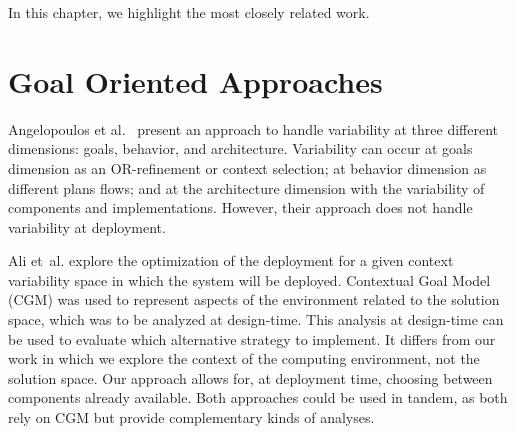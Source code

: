 
In this chapter, we highlight the most closely related work.





\section{Goal Oriented Approaches}
Angelopoulos et al.~\cite{angelopoulos_capturing_2015} present an approach to handle  variability at three different dimensions: goals, behavior, and architecture. Variability can occur at goals dimension as an OR-refinement or context selection; at behavior dimension as different plans flows; and at the architecture dimension with the variability of components and implementations. However, their approach does not handle variability at deployment.


Ali et~al.\cite{ali_requirements-driven_2014} explore the optimization of the deployment for a given context variability space in which the system will be deployed. Contextual Goal Model (CGM) was used to represent aspects of the environment related to the solution space, which was to be analyzed at design-time. This analysis at design-time can be used to evaluate which alternative strategy to implement.
It differs from our work in which we explore the context of the computing environment, not the solution space. Our approach allows for, at deployment time, choosing  between components already available. Both approaches could be used in tandem, as both rely on CGM but provide complementary kinds of analyses.

